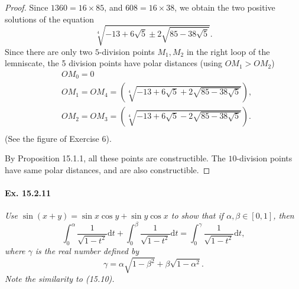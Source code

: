 \documentclass[11pt,a4paper]{article}
\newcommand{\D}{\mathrm{d}}
\begin{document}
\begin{proof}
Since $1360 = 1 6 \times 85$, and $608 = 16 \times 38$, we obtain the two positive solutions of the equation
$$\sqrt[4]{-13 + 6 \sqrt{5} \pm 2 \sqrt{85-38 \sqrt{5}}}.$$
Since there are only two $5$-division points $M_1,M_2$ in the right loop of the lemniscate, the 5 division points have polar distances (using $OM_1 > OM_2$)
\begin{align*}
&OM_0   = 0 \\
&OM_1  = OM_4= \left( \sqrt[4]{-13 + 6 \sqrt{5} +2 \sqrt{85-38 \sqrt{5}}} \right),\\
 &OM_2  = OM_3  = \left( \sqrt[4]{-13 + 6 \sqrt{5} - 2 \sqrt{85-38 \sqrt{5}}} \right).\\
 \end{align*}
 (See the figure of Exercise 6). 
 
 By Proposition 15.1.1, all these points are constructible. The $10$-division points have same polar distances, and are also constructible.
\end{proof}

\paragraph{Ex. 15.2.11}{\it Use $\sin(x+y) = \sin x \cos y + \sin y \cos x$ to show that if $\alpha,\beta \in [0,1]$, then
$$\int_0^\alpha \frac{1}{\sqrt{1-t^2}} \D t + \int_0^\beta \frac{1}{\sqrt{1-t^2}} \D t  = \int_0^\gamma \frac{1}{\sqrt{1-t^2}} \D t,$$
where $\gamma$ is the real number defined by
$$\gamma = \alpha \sqrt{1-\beta^2} + \beta \sqrt{1- \alpha^2}.$$
Note the similarity to (15.10).
}
\end{document}
